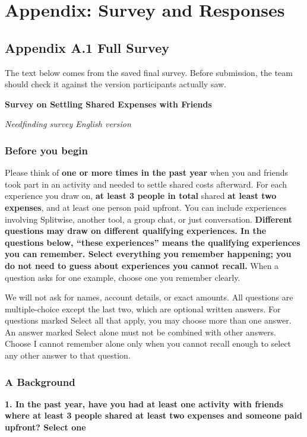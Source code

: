 \section*{Appendix: Survey and Responses}

\subsection*{Appendix A.1 Full Survey}

The text below comes from the saved final survey. Before submission, the team should check it against the version participants actually saw.

\textbf{Survey on Settling Shared Expenses with Friends}

\emph{Needfinding survey English version}

\subsubsection*{Before you begin}

Please think of \textbf{one or more times in the past year} when you and friends took part in an activity and needed to settle shared costs afterward. For each experience you draw on, \textbf{at least 3 people in total} shared \textbf{at least two expenses}, and at least one person paid upfront. You can include experiences involving Splitwise, another tool, a group chat, or just conversation. \textbf{Different questions may draw on different qualifying experiences. In the questions below, ``these experiences'' means the qualifying experiences you can remember. Select everything you remember happening; you do not need to guess about experiences you cannot recall.} When a question asks for one example, choose one you remember clearly.

We will not ask for names, account details, or exact amounts. All questions are multiple-choice except the last two, which are optional written answers. For questions marked Select all that apply, you may choose more than one answer. An answer marked Select alone must not be combined with other answers. Choose I cannot remember alone only when you cannot recall enough to select any other answer to that question.

\subsubsection*{A Background}

\par\smallskip\noindent\textbf{1. In the past year, have you had at least one activity with friends where at least 3 people shared at least two expenses and someone paid upfront? Select one}\par\nobreak

